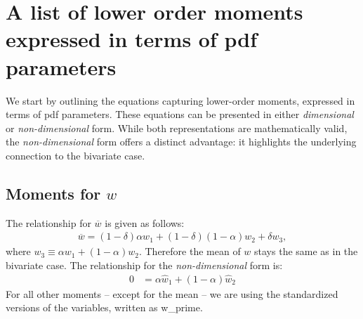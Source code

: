 \section{A list of lower order moments expressed in terms of pdf parameters}
\label{sec:a-list-of-lower-order-moments-expressed-in-terms-of-pdf-parameters}

We start by outlining the equations capturing lower-order moments,
expressed in terms of \gls{pdf} parameters.
These equations can be presented in either \emph{dimensional} or \emph{non-dimensional} form.
While both representations are mathematically valid,
the \emph{non-dimensional} form offers a distinct advantage:
it highlights the underlying connection to the bivariate case.

\subsection{Moments for $w$}\label{subsec:lowerordermoments_w}

The relationship for $\overline{w}$ is given as follows:
\begin{align}
    \label{eq:w_bar}
    \overline{w} = (1 - \delta) \alpha w_1 + (1 - \delta)(1-\alpha) w_2 + \delta w_3,
\end{align}
where $w_3 \equiv \alpha w_1 + (1 - \alpha) w_2$.
Therefore the mean of $w$ stays the same as in the bivariate case.
The relationship for the \emph{non-dimensional} form is:
\begin{align}
    \label{eq:w_bar_nondim}
    0 &= \alpha \widehat{w}_1 + (1 - \alpha) \widehat{w}_2
\end{align}
For all other moments -- except for the mean --
we are using the standardized versions of the variables, written as \gls{w_prime}.

